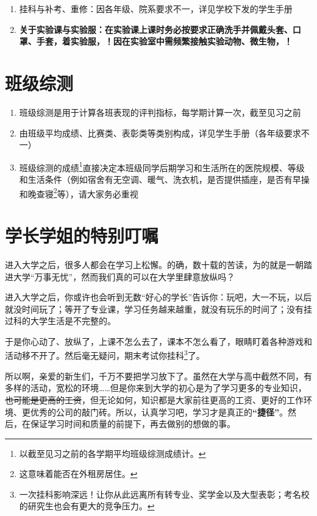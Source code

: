 \begin{enumerate}
    \item 挂科与补考、重修：因各年级、院系要求不一，详见学校下发的学生手册
    \item \textbf{关于实验课与实验服：在实验课上课时务必按要求正确洗手并佩戴头套、口罩、手套，着实验服，！因在实验室中需频繁接触实验动物、微生物，！}
\end{enumerate}

\section[班级综测]{班级综测}
\begin{enumerate}
    \item 班级综测是用于计算各班表现的评判指标，每学期计算一次，截至见习之前
    \item 由班级平均成绩、比赛类、表彰类等类别构成，详见学生手册（各年级要求不一）
    \item 班级综测的成绩\footnote{以截至见习之前的各学期平均班级综测成绩计。}直接决定本班级同学后期学习和生活所在的医院规模、等级和生活条件（例如宿舍有无空调、暖气、洗衣机，是否提供插座，是否有早操和晚查寝\footnote{这意味着能否在外租房居住。}等），请大家务必重视
\end{enumerate}

\section[学长学姐的特别叮嘱]{学长学姐的特别叮嘱}

进入大学之后，很多人都会在学习上松懈。的确，数十载的苦读，为的就是一朝踏进大学“万事无忧”，然而我们真的可以在大学里肆意放纵吗？

进入大学之后，你或许也会听到无数“好心的学长”告诉你：玩吧，大一不玩，以后就没时间玩了；等开了专业课，学习任务越来越重，就没有玩乐的时间了；没有挂过科的大学生活是不完整的。

于是你心动了、放纵了，上课不怎么去了，课本不怎么看了，眼睛盯着各种游戏和活动移不开了。然后毫无疑问，期末考试你挂科\footnote{一次挂科影响深远！让你从此远离所有转专业、奖学金以及大型表彰；考名校的研究生也会有更大的竞争压力。}了。

所以啊，亲爱的新生们，千万不要把学习放下了。虽然在大学与高中截然不同，有多样的活动，宽松的环境……但是你来到大学的初心是为了学习更多的专业知识，\sout{也可能是更高的工资}，但无论如何，知识都是大家前往更高的工资、更好的工作环境、更优秀的公司的敲门砖。所以，认真学习吧，学习才是真正的\textbf{“捷径”}。然后，在保证学习时间和质量的前提下，再去做别的想做的事。
